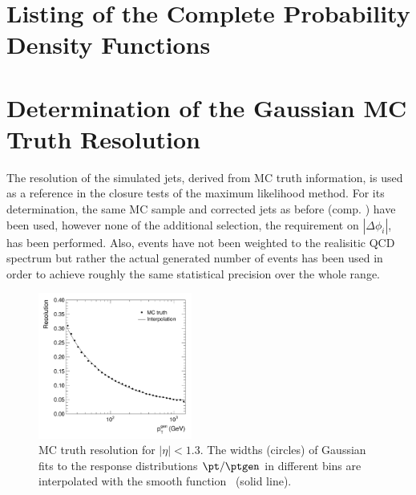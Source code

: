\appendix


\section{Listing of the Complete Probability Density
  Functions}\label{sec:ResFit:App:Pdf}



\section{Determination of the Gaussian MC Truth Resolution}\label{sec:ResFit:App:MCTruth}

The resolution of the simulated jets, derived from MC truth information, is used as a reference in the closure tests of the maximum likelihood method.
For its determination, the same MC sample and corrected jets as before (comp. ) have
been used, however none of the additional selection, \eg the requirement
on $|\Delta\phi_{i}|$, has been performed.
Also, events have not been weighted to the realisitic QCD spectrum but
rather the actual generated number of events has been used in order
to achieve roughly the same statistical precision over the whole \pt range.

\begin{figure}[ht]
  \centering
  \includegraphics[width=0.45\textwidth]{figures/hMCTruthReso}
  \caption{MC truth resolution for \mbox{$|\eta| < 1.3$}.
  The widths (circles) of Gaussian fits to the response distributions
  \mbox{$\pt/\ptgen$} in different \ptgen bins are interpolated with the
  smooth function~ (solid line).}
  \label{fig:ResFit:App:MCTruthReso}
\end{figure}

